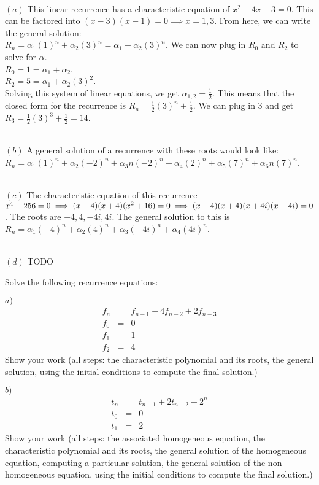 \documentclass[11pt]{article}
\begin{document}
\begin{solution} \\
	$(a)$ 
		This linear recurrence has a characteristic equation of $x^2 - 4x + 3 = 0$. This can be factored into $(x-3)(x-1) = 0 \implies x = 1, 3$. From here, we can write the general solution: \\ $R_n = \alpha_1(1)^n + \alpha_2(3)^n = \alpha_1 + \alpha_2(3)^n$. We can now plug in $R_0$ and $R_2$ to solve for $\alpha$. \\ $R_0 = 1 = \alpha_1 + \alpha_2$. \\ $R_2 = 5 = \alpha_1 + \alpha_2(3)^2$. \\ Solving this system of linear equations, we get $\alpha_{1,2} = \frac{1}{2}$. This means that the closed form for the recurrence is $R_n = \frac{1}{2}(3)^n + \frac{1}{2}$. We can plug in 3 and get $R_3 = \frac{1}{2}(3)^3 + \frac{1}{2} = 14$. 

	\text{}\\
	$(b)$
		A general solution of a recurrence with these roots would look like: \\ \text{}\quad\quad $R_n = \alpha_1(1)^n + \alpha_2(-2)^n + \alpha_3n(-2)^n + \alpha_4(2)^n + \alpha_5(7)^n + \alpha_6n(7)^n$.

	\text{}\\
	$(c)$
		The characteristic equation of this recurrence $x^4 - 256 = 0 \implies (x-4)(x+4)(x^2+16)=0 \\\implies (x-4)(x+4)(x+4i)(x-4i)=0$. The roots are $-4, 4, -4i, 4i$. The general solution to this is $R_n = \alpha_1(-4)^n + \alpha_2(4)^n + \alpha_3(-4i)^n + \alpha_4(4i)^n$.

	\text{}\\
	$(d)$
		TODO

	\end{solution}

\newpage
\begin{problem}
	Solve the following recurrence equations:

%
$a)$
\begin{eqnarray*}
        f_n &=& f_{n-1} + 4f_{n-2} + 2f_{n-3}\\
        f_0 &=& 0 \\
        f_1 &=& 1 \\
		f_2 &=& 4 
\end{eqnarray*}
%
Show your work (all steps: the characteristic polynomial and its roots, the general solution, 
using the initial conditions to compute the final solution.)


$b)$
\begin{eqnarray*}
        t_n &=& t_{n-1} + 2t_{n-2} + 2^n\\
        t_0 &=& 0 \\
        t_1 &=& 2
\end{eqnarray*}
%
Show your work (all steps: the associated homogeneous equation,
the characteristic polynomial and its
roots, the general solution of the homogeneous
equation, computing a particular solution,
the general solution of the non-homogeneous equation,
using the initial conditions to compute the final solution.)
%
\end{problem}
\end{document}
